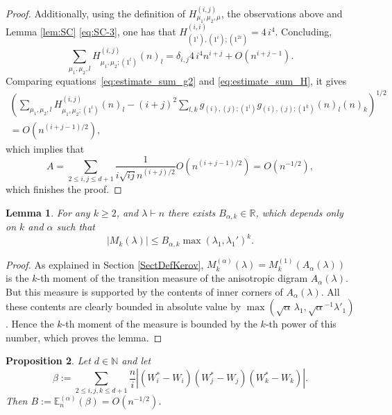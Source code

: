 \documentclass[11pt]{amsart}
\theoremstyle{plain}
\newtheorem{lemma}{Lemma}[section]
\newtheorem{proposition}[lemma]{Proposition}
\theoremstyle{remark}
\newcommand{\RR}{\mathbb{R}}
\newcommand{\N}{\mathbb{N}}
\newcommand{\esper}{\mathbb{E}}
\begin{document}
\begin{proof}
Additionally, using the definition of $H^{(i,j)}_{\mu_1,\mu_2,\mu}$,
the observations above and
Lemma \ref{lem:SC} \eqref{eq:SC-3},
one has that $H^{(i,i)}_{(1^i), (1^i); (1^{2i})} = 4 \, i^4$. Concluding,
\begin{equation}\label{eq:estimate_sum_H}
    \sum_{\mu_1, \mu_2, l}H^{(i,j)}_{\mu_1, \mu_2; (1^l)}(n)_l = \delta_{i,j}
    4\, i^4 n^{i+j} + O(n^{i+j-1}).
\end{equation}
Comparing equations~\eqref{eq:estimate_sum_g2} and \eqref{eq:estimate_sum_H},
it gives
\begin{multline}
\left(\sum_{\mu_1, \mu_2, l}H^{(i,j)}_{\mu_1, \mu_2; (1^l)}(n)_l - (i+j)^2\sum_{l,k} g_{(i), (j); (1^l)}g_{(i), (j); (1^k)} (n)_l(n)_k \right)^{1/2}\\
 = O(n^{(i+j-1)/2}),
 \label{eq:TechnicalBound}
\end{multline}
which implies that
\[ A = \sum_{2 \leq i,j \leq d+1} \frac{1}{i\sqrt{ij} n^{(i+j)/2}}O(n^{(i+j-1)/2}) = O(n^{-1/2}),\]
which finishes the proof.
\end{proof}

\begin{lemma}
\label{lem:momentsDegree}
For any $k \geq 2$, and $\lambda \vdash n$ there exists $B_{\alpha,k} \in \RR$, which depends only on $k$ and $\alpha$ such that
\[ |M_k(\lambda)| \leq B_{\alpha,k} \max(\lambda_1, \lambda_1')^k .\]
\end{lemma}

\begin{proof}
    As explained in Section \ref{SectDefKerov}, $M^{(\alpha)}_k(\lambda)=M^{(1)}_k(A_\alpha(\lambda))$
    is the $k$-th moment of the transition measure of the anisotropic digram $A_\alpha(\lambda)$.
    But this measure is supported by the contents of inner corners of $A_\alpha(\lambda)$.
    All these contents are clearly bounded in absolute value 
    by $\max(\sqrt{\alpha} \, \lambda_1, \sqrt{\alpha}^{-1} \lambda'_1)$.
    Hence the $k$-th moment of the measure is bounded by the $k$-th power of this number,
    which proves the lemma.
\end{proof}

\begin{proposition}
\label{prop:ErrorTermB}
Let $d \in \N$ and let
\[ \beta := \sum_{2 \leq i,j,k \leq d+1} \frac{n}{i} |(W_i^* - W_i)(W_j^* - W_j)(W_k^* - W_k)|.\] 
Then $B := \esper_n^{(\alpha)}(\beta) = O(n^{-1/2})$.
\end{proposition}
\end{document}
